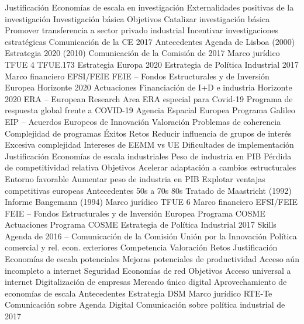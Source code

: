\documentclass{nuevotema}
\begin{document}
\begin{esquema}[enumerate]
	\1 
		\2 Justificación
			\3 Economías de escala en investigación
			\3 Externalidades positivas de la investigación
			\3 Investigación básica
		\2 Objetivos
			\3 Catalizar investigación básica
			\3 Promover transferencia a sector privado industrial
			\3 Incentivar investigaciones estratégicas
			\3 Comunicación de la CE 2017
		\2 Antecedentes
			\3 Agenda de Lisboa (2000)
			\3 Estrategia 2020 (2010)
			\3 Comunicación de la Comisión de 2017
		\2 Marco jurídico
			\3 TFUE 4
			\3 TFUE.173
			\3 Estrategia Europa 2020
			\3 Estrategia de Política Industrial 2017
		\2 Marco financiero
			\3 EFSI/FEIE
			\3 FEIE -- Fondos Estructurales y de Inversión Europea
			\3 Horizonte 2020
		\2 Actuaciones
			\3 Financiación de I+D e industria
			\3 Horizonte 2020
			\3 ERA -- European Research Area
			\3 ERA especial para Covid-19
			\3 Programa de respuesta global frente a COVID-19
			\3 Agencia Espacial Europea
			\3 Programa Galileo
			\3 EIP -- Acuerdos Europeos de Innovación
		\2 Valoración
			\3 Problemas de coherencia
			\3 Complejidad de programas
			\3 Éxitos
		\2 Retos
			\3 Reducir influencia de grupos de interés
			\3 Excesiva complejidad
			\3 Intereses de EEMM vs UE
			\3 Dificultades de implementación
	\1 
		\2 Justificación
			\3 Economías de escala industriales
			\3 Peso de industria en PIB
			\3 Pérdida de competitividad relativa
		\2 Objetivos
			\3 Acelerar adaptación a cambios estructurales
			\3 Entorno favorable
			\3 Aumentar peso de industria en PIB
			\3 Explotar ventajas competitivas europeas
		\2 Antecedentes
			\3 50s a 70s
			\3 80s
			\3 Tratado de Maastricht (1992)
			\3 Informe Bangemann (1994)
		\2 Marco jurídico
			\3 TFUE 6
		\2 Marco financiero
			\3 EFSI/FEIE
			\3 FEIE -- Fondos Estructurales y de Inversión Europea
			\3 Programa COSME
		\2 Actuaciones
			\3 Programa COSME
			\3 Estrategia de Política Industrial 2017
			\3 Skills Agenda de 2016 -- Comunicación de la Comisión
			\3 Unión por la Innovación
			\3 Política comercial y rel. econ. exteriores
			\3 Competencia
		\2 Valoración
		\2 Retos
	\1 
		\2 Justificación
			\3 Economías de escala potenciales
			\3 Mejoras potenciales de productividad
			\3 Acceso aún incompleto a internet
			\3 Seguridad
			\3 Economías de red
		\2 Objetivos
			\3 Acceso universal a internet
			\3 Digitalización de empresas
			\3 Mercado único digital
			\3 Aprovechamiento de economías de escala
		\2 Antecedentes
			\3 Estrategia DSM
		\2 Marco jurídico
			\3 RTE-Te
			\3 Comunicación sobre Agenda Digital
			\3 Comunicación sobre política industrial de 2017

\end{esquema}
\end{document}
